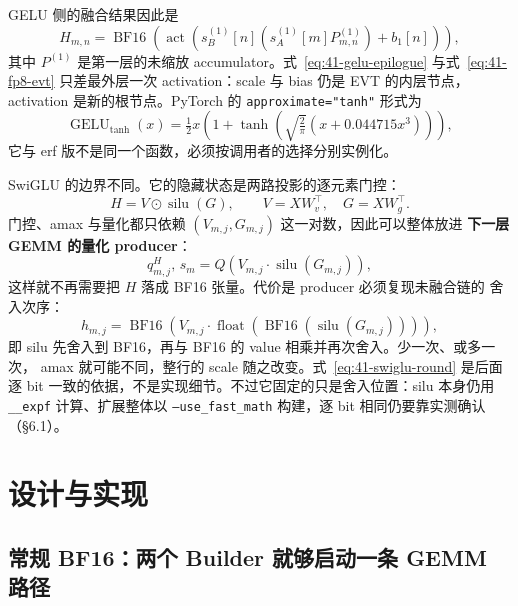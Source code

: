 GELU 侧的融合结果因此是
\begin{equation}
  H_{m,n}=\operatorname{BF16}\!\left(\operatorname{act}\!\left(
    s^{(1)}_B[n]\left(s^{(1)}_A[m]P^{(1)}_{m,n}\right)+b_1[n]\right)\right),
  \label{eq:41-gelu-epilogue}
\end{equation}
其中 $P^{(1)}$ 是第一层的未缩放 accumulator。式~\ref{eq:41-gelu-epilogue}
与式~\ref{eq:41-fp8-evt} 只差最外层一次 activation：scale 与 bias 仍是 EVT
的内层节点，activation 是新的根节点。PyTorch 的
\texttt{approximate="tanh"} 形式为
\begin{equation}
  \operatorname{GELU}_{\tanh}(x)=\tfrac12 x\left(1+\tanh\!\left(
    \sqrt{\tfrac{2}{\pi}}\left(x+0.044715x^{3}\right)\right)\right),
  \label{eq:41-gelu-tanh}
\end{equation}
它与 erf 版不是同一个函数，必须按调用者的选择分别实例化。

SwiGLU 的边界不同。它的隐藏状态是两路投影的逐元素门控：
\begin{equation}
  H=V\odot\operatorname{silu}(G),\qquad
  V=XW_v^{\top},\quad G=XW_g^{\top}.
  \label{eq:41-swiglu}
\end{equation}
门控、amax 与量化都只依赖 $(V_{m,j},G_{m,j})$ 这一对数，因此可以整体放进
\textbf{下一层 GEMM 的量化 producer}：
\begin{equation}
  q^{H}_{m,j},\,s_m=Q\!\left(V_{m,j}\cdot\operatorname{silu}(G_{m,j})\right),
  \label{eq:41-swiglu-producer}
\end{equation}
这样就不再需要把 $H$ 落成 BF16 张量。代价是 producer 必须复现未融合链的
舍入次序：
\begin{equation}
  h_{m,j}=\operatorname{BF16}\!\left(V_{m,j}\cdot
    \operatorname{float}\!\left(\operatorname{BF16}\!\left(
      \operatorname{silu}(G_{m,j})\right)\right)\right),
  \label{eq:41-swiglu-round}
\end{equation}
即 silu 先舍入到 BF16，再与 BF16 的 value 相乘并再次舍入。少一次、或多一次，
amax 就可能不同，整行的 scale 随之改变。式~\ref{eq:41-swiglu-round} 是后面
逐 bit 一致的依据，不是实现细节。不过它固定的只是舍入位置：silu 本身仍用
\texttt{\_\_expf} 计算、扩展整体以 \texttt{--use\_fast\_math} 构建，逐 bit
相同仍要靠实测确认（§6.1）。

\section{设计与实现}

\subsection{常规 BF16：两个 Builder 就够启动一条 GEMM 路径}

